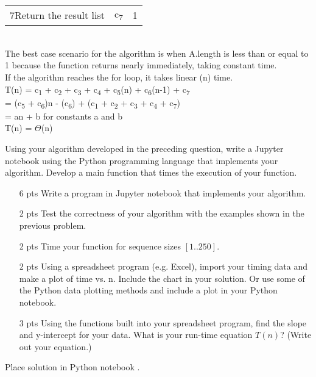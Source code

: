 \documentclass[11pt]{article}
\begin{document}
\begin{questions}
\begin{solutionorbox}
\begin{tabular}{l c c}
	    7\quad Return the result list & c\textsubscript{7} & 1\\
	\end{tabular}\\
	The best case scenario for the algorithm is when A.length is less than or equal to 1 because the function returns nearly immediately, taking constant time.\\
	If the algorithm reaches the for loop, it takes linear (n) time.\\
	T(n) = c\textsubscript{1} + c\textsubscript{2} + c\textsubscript{3} + c\textsubscript{4} + c\textsubscript{5}(n) + c\textsubscript{6}(n-1) + c\textsubscript{7}\\
	\null\qquad\space = (c\textsubscript{5} + c\textsubscript{6})n - (c\textsubscript{6}) + (c\textsubscript{1} + c\textsubscript{2} + c\textsubscript{3} + c\textsubscript{4} + c\textsubscript{7})\\
	\null\qquad\space = an + b for constants a and b\\
	T(n) = $\Theta$(n)
\end{solutionorbox}

\ifprintanswers
\newpage
\else
\bigskip
\fi


%
%
\question[15]
Using your algorithm developed in the preceding question, write a Jupyter notebook using the Python programming language that implements your algorithm.  Develop a main function that times the execution of your  function.
\begin{enumerate}
	\item [6 pts] Write a program in Jupyter notebook that implements your algorithm.
	\item [2 pts] Test the correctness of your algorithm with the examples shown in the previous problem.
	\item [2 pts] Time your  function for sequence sizes $[1..250]$.  
	\item [2 pts] Using a spreadsheet program (e.g. Excel), import your timing data and make a plot of time vs. n.  Include the chart in your solution.  Or use some of the Python data plotting methods and include a plot in your Python notebook.
	\item [3 pts] Using the functions built into your spreadsheet program, find the slope and y-intercept for your data.  What is your run-time equation $T(n)$?  (Write out your equation.)
\end{enumerate}
\begin{solutionorbox}
	Place solution in Python notebook .
\end{solutionorbox}


\end{questions}
\end{document}
